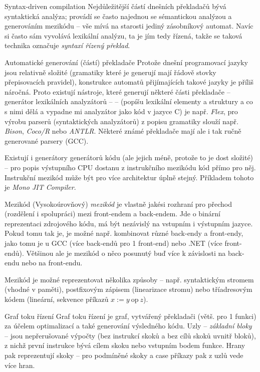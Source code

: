 \begin{poznamkaN}{Syntax-driven compilation}
Nejdůležitější částí dnešních překladačů bývá syntaktická analýza; provádí se často najednou se sémantickou analýzou a generováním mezikódu -- vše mívá na starosti jediný zásobníkový automat. Navíc si často sám vyvolává lexikální analýzu, ta je jím tedy řízená, takže se taková technika označuje \emph{syntaxí řízený překlad}.
\end{poznamkaN}

\begin{obecne}{Automatické generování (částí) překladače}
Protože dnešní programovací jazyky jsou relativně složité (gramatiky které je generují mají řádově stovky přepisovacích pravidel), konstrukce automatů přijímajících takové jazyky  je příliš náročná. Proto existují nástroje, které generují některé části překladače -- generátor lexikálních analyzátorů --  -- (popíšu lexikální elementy a struktury a co s nimi dělá a vypadne mi analyzátor jako kód v jazyce C) je např. \emph{Flex}, pro výrobu parserů (syntaktických analyzátorů) z popisu gramatiky slouží např. \emph{Bison}, \emph{Coco/R} nebo \emph{ANTLR}. Některé známé překladače mají ale i tak ručně generované parsery (GCC).

Existují i generátory generátorů kódu (ale jejich méně, protože to je dost složité) -- pro popis výstupního CPU dostanu z instrukčního mezikódu kód přímo pro něj. Instrukční mezikód může být pro více architektur úplně stejný. Příkladem tohoto je \emph{Mono JIT Compiler}.
\end{obecne}


\begin{obecne}{Mezikód}
(Vysokoúrovňový) \emph{mezikód} je vlastně jakési rozhraní pro přechod (rozdělení i spolupráci) mezi front-endem a back-endem. Jde o binární reprezentaci zdrojového kódu, má být nezávislý na vstupním i výstupním jazyce. Pokud tomu tak je, je možné např. kombinovat různé back-endy a front-endy, jako tomu je u GCC (více back-endů pro 1 front-end) nebo .NET (více front-endů). Většinou ale je mezikód o něco posunutý buď více k závislosti na back-endu nebo na front-endu.

Mezikód je možné reprezentovat několika způsoby -- např. syntaktickým stromem (vhodné v paměti), postfixovým zápisem (linearizace stromu) nebo tříadresovým kódem (lineární, sekvence příkazů $x:= y\ \mathrm{op}\ z$).
\end{obecne}

\begin{obecne}{Graf toku řízení}
Graf toku řízení je graf, vytvářený překladači (větš. pro 1 funkci) za účelem optimalizací a také generování výsledného kódu. Uzly -- \emph{základní bloky} -- jsou nepřerušované výpočty (bez instrukcí skoků a bez cílů skoků uvnitř bloků), z nichž první instrukce bývá cílem skoku nebo vstupním bodem funkce. Hrany pak reprezentují skoky -- pro podmíněné skoky a case příkazy pak z uzlů vede více hran.
\end{obecne}

